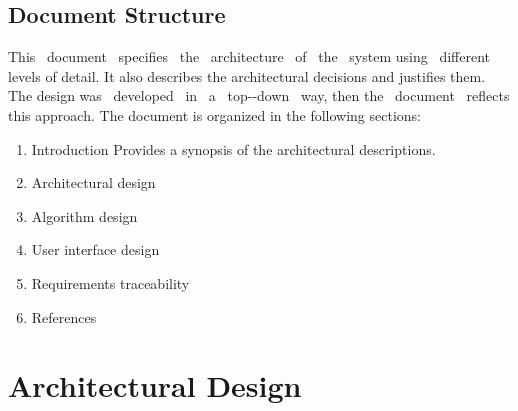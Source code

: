 \documentclass[a4paper,11pt]{report} %
\begin{document}
	\subsection{Document Structure} This  document  specifies  the  architecture  of  the  system  using  different levels of detail. It also describes the architectural decisions and justifies them. The design was  developed  in  a  top-­‐down  way, then the  document  reflects this approach.
	The document is organized in the following sections:
	\begin{enumerate}
		\item Introduction
		Provides a synopsis of the architectural descriptions.
		\item Architectural design
		\item Algorithm design
		\item User interface design
		\item Requirements traceability
		\item References
		
	\end{enumerate} 
	
	\section{Architectural Design}
	
\end{document}
